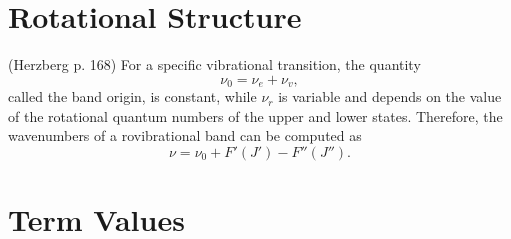 \documentclass[11pt, twoside, fleqn]{report}
\begin{document}
    \section{Rotational Structure}

    (Herzberg p. 168)
    For a specific vibrational transition, the quantity
    \begin{equation*}
        \nu_{0} = \nu_{e} + \nu_{v},
    \end{equation*}
    called the band origin, is constant, while $\nu_{r}$ is variable and depends on the value of the rotational quantum numbers of the upper and lower states. Therefore, the wavenumbers of a rovibrational band can be computed as
    \begin{equation*}
        \nu = \nu_{0} + F'(J') - F''(J'').
    \end{equation*}

    \section{Term Values}
\end{document}

